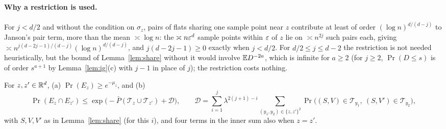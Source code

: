 \documentclass[11pt]{article}
\begin{document}
\paragraph{Why a restriction is used.} For $j<d/2$ and without the condition on $\sigma_z$, pairs of flats sharing one sample
point near $z$ contribute at least of order $(\log n)^{d/(d-j)}$ to Janson's pair term, more than the mean $\asymp\log n$: the
$\asymp n\varepsilon^d$ sample points within $\varepsilon$ of $z$ lie on $\asymp n^{2j}$ such pairs each, giving
$\asymp n^{j(d-2j-1)/(d-j)}(\log n)^{d/(d-j)}$, and $j(d-2j-1)\ge0$ exactly when $j<d/2$. For $d/2\le j\le d-2$ the restriction is not
needed heuristically, but the bound of Lemma~\ref{lem:share} without it would involve $\mathbb{E} D^{-2a}$, which is infinite for $a\ge2$ (for
$j\ge2$, $\Pr(D\le s)$ is of order $s^{a+1}$ by Lemma~\ref{lem:ig}(c) with $j-1$ in place of $j$); the restriction costs nothing.

\begin{lemma}\label{lem:poisson}
For $z,z'\in\mathbb{R}^d$, (a) $\Pr(E_z)\ge e^{-\mu_z}$, and (b)
\[
  \Pr(E_z\cap E_{z'})\le\exp\bigl(-\bar P(\mathcal T_z\cup\mathcal T_{z'})+\mathcal D\bigr),\qquad
  \mathcal D=\sum_{i=1}^{j}\lambda^{2(j+1)-i}\sum_{(y_1,y_2)\in\{z,z'\}^2}\Pr\bigl((S,V)\in\mathcal T_{y_1},\ (S,V')\in\mathcal T_{y_2}\bigr),
\]
with $S,V,V'$ as in Lemma~\ref{lem:share} (for this $i$), and four terms in the inner sum also when $z=z'$.
\end{lemma}
\end{document}
